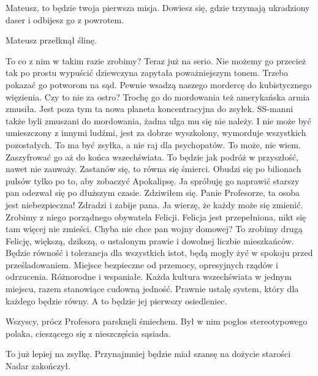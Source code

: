 \begin{dialogue}
\ds{} Mateusz, to będzie twoja pierwsza misja. Dowiesz się, gdzie trzymają ukradziony daser i odbijesz go z powrotem. 
\end{dialogue}

Mateusz przełknął ślinę.

\begin{dialogue}
\ds{} To co z nim w takim razie zrobimy? Teraz już na serio. Nie możemy go przecież tak po prostu wypuścić \dm{} dziewczyna zapytała poważniejszym tonem.
\ds{} Trzeba pokazać go potworom na sąd. Pewnie wsadzą naszego mordercę do kubistycznego więzienia.
\ds{} Czy to nie za ostro? Trochę go do mordowania też amerykańska armia zmusiła. Jest poza tym ta nowa planeta koncentracyjna do zsyłek.
\ds{} SS-manni także byli zmuszani do mordowania, żadna ulga mu się nie należy. 
I nie może być umieszczony z innymi ludźmi, jest za dobrze wyszkolony, wymorduje wszystkich pozostałych. To ma być zsyłka, a nie raj dla psychopatów.
\ds{} To może, nie wiem. Zaszyfrować go aż do końca wszechświata. To będzie jak podróż w przyszłość, nawet nie zauważy.
\ds{} Zastanów się, to równa się śmierci. Obudzi się po bilionach pulsów tylko po to, aby zobaczyć Apokalipsę.
\ds{} Ja spróbuję go naprawić \dm{} starszy pan odezwał się po dłuższym czasie. Zdziwiłem się.
\ds{} Panie Profesorze, ta osoba jest niebezpieczna! Zdradzi i zabije pana.
\ds{} Ja wierzę, że każdy może się zmienić. Zrobimy z niego porządnego obywatela Felicji.
\ds{} Felicja jest przepełniona, nikt się tam więcej nie zmieści. Chyba nie chce pan wojny domowej?
\ds{} To zrobimy drugą Felicję, większą, dzikszą, o ustalonym prawie i dowolnej liczbie mieszkańców. Będzie równość i tolerancja dla wszystkich istot, będą mogły żyć w spokoju przed prześladowaniem.
Miejsce bezpieczne od przemocy, opresyjnych rządów i odrzucenia. Różnorodne i wspaniałe. Każda kultura wszechświata w jednym miejscu, razem stanowiące cudowną jedność.
Prawnie ustalę system, który dla każdego będzie równy.
A to będzie jej pierwszy osiedleniec.
\end{dialogue}

Wszyscy, prócz Profesora parsknęli śmiechem.
Był w nim pogłos stereotypowego polaka, cieszącego się z nieszczęścia sąsiada.

\begin{dialogue}
\ds{} To już lepiej na zsyłkę. Przynajmniej będzie miał szansę na dożycie starości \dm{} Nadar zakończył.
\end{dialogue}

